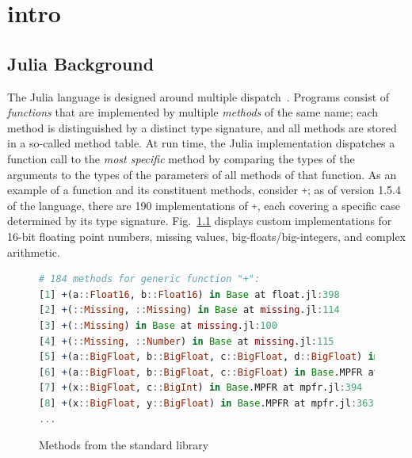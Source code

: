 \documentclass[oneside,openright,titlepage,numbers=noenddot,%
headinclude,footinclude,cleardoublepage=empty,abstract=on,
BCOR=5mm,paper=a4,fontsize=11pt,
dvipsnames
]{scrreprt}
\renewcommand{\c}[1]{\lstinline[language=Julia]!#1!\xspace}
\begin{document}

\chapter{intro}%
\label{chap-intro}

\section{Julia Background}%
\label{sec-julia}

The Julia language is designed around multiple dispatch~\cite{BezansonEKS17}.
Programs consist of \emph{functions} that are implemented by multiple
\emph{methods} of the same name; each method is distinguished by a distinct type
signature, and all methods are stored in a so-called method table.
At run time, the Julia implementation dispatches a function call to
the \emph{most specific} method by comparing the types of the arguments to the
types of the parameters of all methods of that function. As an example of a
function and its constituent methods, consider \c{+}; as of version 1.5.4 of the
language, there are 190 implementations of \c{+}, each covering a
specific case determined by its type signature. Fig.~\ref{plus} displays custom
implementations for 16-bit floating point numbers, missing values,
big-floats/big-integers, and complex arithmetic.

\begin{figure}
\begin{lstlisting}[language=julia]
# 184 methods for generic function "+":
[1] +(a::Float16, b::Float16) in Base at float.jl:398
[2] +(::Missing, ::Missing) in Base at missing.jl:114
[3] +(::Missing) in Base at missing.jl:100
[4] +(::Missing, ::Number) in Base at missing.jl:115
[5] +(a::BigFloat, b::BigFloat, c::BigFloat, d::BigFloat) in Base.MPFR at mpfr.jl:541
[6] +(a::BigFloat, b::BigFloat, c::BigFloat) in Base.MPFR at mpfr.jl:535
[7] +(x::BigFloat, c::BigInt) in Base.MPFR at mpfr.jl:394
[8] +(x::BigFloat, y::BigFloat) in Base.MPFR at mpfr.jl:363
...
\end{lstlisting}
\caption{Methods from the standard library}\label{plus}
\end{figure}
\end{document}
